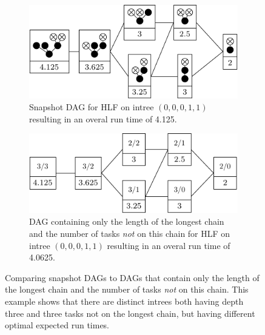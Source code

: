 \begin{figure}[th]
  \begin{subfigure}{.45\textwidth}
    \centering
    \includegraphics{p2/00011.pdf}
    \caption{Snapshot DAG for HLF on intree $(0,0,0,1,1)$ resulting in an overal run time of 4.125.}
  \end{subfigure}
  \quad
  \begin{subfigure}{.45\textwidth}
    \centering
    \includegraphics{p2/00011_chain.pdf}
    \caption{DAG containing only the length of the longest chain and the number of tasks \emph{not} on this chain for HLF on intree $(0,0,0,1,1)$ resulting in an overal run time of 4.0625.}
  \end{subfigure}

  \caption{Comparing snapshot DAGs to DAGs that contain only the length of the longest chain and the number of tasks \emph{not} on this chain. This example shows that there are distinct intrees both having depth three and three tasks not on the longest chain, but having different optimal expected run times.}
  \label{fig:p2-different-intrees-same-chainside}
\end{figure}

